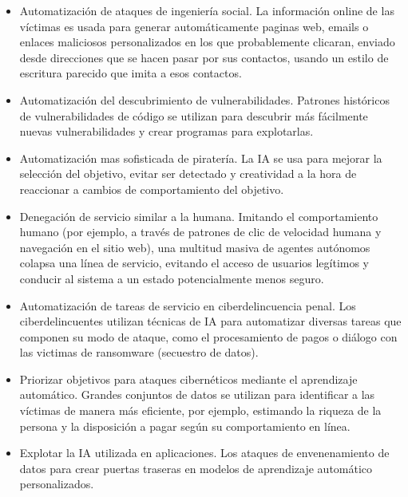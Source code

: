 \documentclass[12pt,a4paper]{article}
\begin{document}
\begin{itemize}

\item Automatización de ataques de ingeniería social. La información online de las víctimas es usada para generar automáticamente paginas web, emails o enlaces maliciosos personalizados en los que probablemente clicaran, enviado desde direcciones que se hacen pasar por sus contactos, usando un estilo de escritura parecido que imita a esos contactos.

\item Automatización del descubrimiento de vulnerabilidades. Patrones históricos de vulnerabilidades de código se utilizan para descubrir más fácilmente nuevas vulnerabilidades y crear programas para explotarlas.

\item Automatización mas sofisticada de piratería. La IA se usa para mejorar la selección del objetivo, evitar ser detectado y creatividad a la hora de reaccionar a cambios de comportamiento del objetivo.

\item Denegación de servicio similar a la humana. Imitando el comportamiento humano (por ejemplo, a través de patrones de clic de velocidad humana y navegación en el sitio web), una multitud masiva de agentes autónomos colapsa una línea de servicio, evitando el acceso de usuarios legítimos y conducir al sistema a un estado potencialmente menos seguro.

\item Automatización de tareas de servicio en ciberdelincuencia penal. Los ciberdelincuentes utilizan técnicas de IA para automatizar diversas tareas que componen su modo de ataque, como el procesamiento de pagos o diálogo con las victimas de ransomware (secuestro de datos).

\item Priorizar objetivos para ataques cibernéticos mediante el aprendizaje automático. Grandes conjuntos de datos se utilizan para identificar a las víctimas de manera más eficiente, por ejemplo, estimando la riqueza de la persona y la disposición a pagar según su comportamiento en línea.

\item Explotar la IA utilizada en aplicaciones. Los ataques de envenenamiento de datos para crear puertas traseras en modelos de aprendizaje automático personalizados.

\end{itemize}
\end{document}
